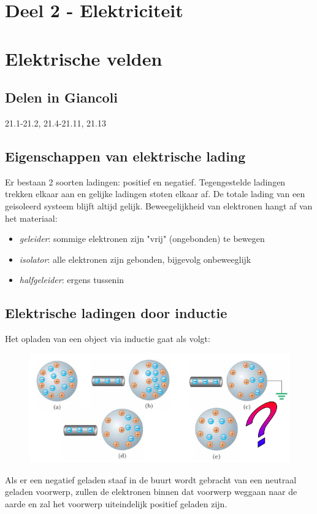 \documentclass[12pt,a4paper]{article}
\begin{document}
    \section{Deel 2 - Elektriciteit}


    \section{Elektrische velden}

    \subsection{Delen in Giancoli}
    21.1-21.2, 21.4-21.11, 21.13
	\subsection{Eigenschappen van elektrische lading}
	Er bestaan 2 soorten ladingen: positief en negatief. Tegengestelde ladingen trekken elkaar aan en gelijke ladingen stoten elkaar af. De totale lading van een geisoleerd systeem blijft altijd gelijk. Beweegelijkheid van elektronen hangt af van het materiaal:
	\begin{itemize}
		\item \textit{geleider}: sommige elektronen zijn "vrij" (ongebonden) te bewegen
		\item \textit{isolator}: alle elektronen zijn gebonden, bijgevolg onbeweeglijk
		\item  \textit{halfgeleider}: ergens tussenin
	\end{itemize}
	
	\subsection{Elektrische ladingen door inductie}
	Het opladen van een object via inductie gaat als volgt:
	\begin{figure}[h]
		\centering
		\includegraphics[width=0.7\linewidth]{inductie}
		\label{inductie}
	\end{figure}
	Als er een negatief geladen staaf in de buurt wordt gebracht van een neutraal geladen voorwerp, zullen de elektronen binnen dat voorwerp weggaan naar de aarde en zal het voorwerp uiteindelijk positief geladen zijn. 
	
\end{document}

